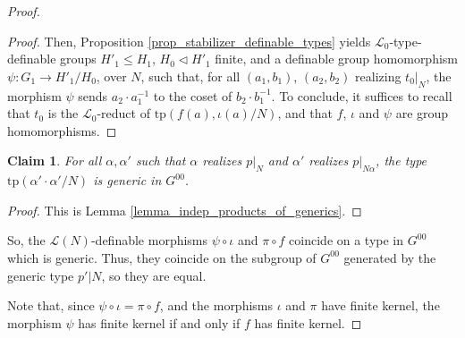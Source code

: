 \documentclass[12pt]{article}
\newcommand{\tpp}{\mathrm{tp}}
\newcommand{\0}{\emptyset}
\theoremstyle{plain}%
\newtheorem{claim}{Claim}
\theoremstyle{definition}
\theoremstyle{remark}
\begin{document}
\begin{proof}
\begin{proof}
    Then, Proposition \ref{prop_stabilizer_definable_types} yields $\mathcal{L}_0$-type-definable groups $H'_1 \leq H_1$, $H_0 \lhd H'_1$ finite, and a definable group homomorphism $\psi: G_1 \rightarrow H'_1 / H_0$, over $N$, such that, for all $(a_1, b_1)$, $(a_2, b_2)$ realizing $t_0|_N$, the morphism $\psi$ sends $a_2 \cdot a_1^{-1}$ to the coset of $b_2\cdot b_1^{-1}$. To conclude, it suffices to recall that $t_0$ is the $\mathcal{L}_0$-reduct of $\tpp(f(a), \iota(a) / N)$, and that $f$, $\iota$ and $\psi$ are group homomorphisms.
    \end{proof}


\begin{claim}
    For all $\alpha, \alpha'$ such that $\alpha$ realizes $p|_N$ and $\alpha'$ realizes $p|_{N\alpha}$, the type $\tpp(\alpha'\cdot \alpha' / N)$ is generic in $G^{00}$.
\end{claim}

\begin{proof}
This is Lemma \ref{lemma_indep_products_of_generics}.
\end{proof}



So, the $\mathcal{L}(N)$-definable morphisms $\psi \circ \iota$ and $\pi \circ f$ coincide on a type in $G^{00}$ which is generic. Thus, they coincide on the subgroup of $G^{00}$ generated by the generic type $p'|N$, so they are equal. 



Note that, since $\psi \circ \iota = \pi \circ f$, and the morphisms $\iota$ and $\pi$ have finite kernel, the morphism $\psi$ has finite kernel if and only if $f$ has finite kernel. 



\end{proof}
\end{document}
